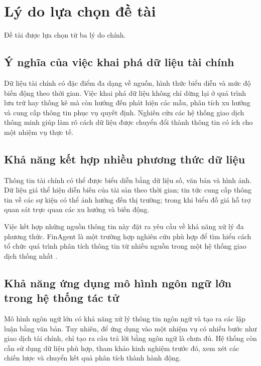\section{Lý do lựa chọn đề tài}

Đề tài được lựa chọn từ ba lý do chính.

\subsection{Ý nghĩa của việc khai phá dữ liệu tài chính}

Dữ liệu tài chính có đặc điểm đa dạng về nguồn, hình thức biểu diễn và mức độ biến động theo thời gian. Việc khai phá dữ liệu không chỉ dừng lại ở quá trình lưu trữ hay thống kê mà còn hướng đến phát hiện các mẫu, phân tích xu hướng và cung cấp thông tin phục vụ quyết định. Nghiên cứu các hệ thống giao dịch thông minh giúp làm rõ cách dữ liệu được chuyển đổi thành thông tin có ích cho một nhiệm vụ thực tế.

\subsection{Khả năng kết hợp nhiều phương thức dữ liệu}

Thông tin tài chính có thể được biểu diễn bằng dữ liệu số, văn bản và hình ảnh. Dữ liệu giá thể hiện diễn biến của tài sản theo thời gian; tin tức cung cấp thông tin về các sự kiện có thể ảnh hưởng đến thị trường; trong khi biểu đồ giá hỗ trợ quan sát trực quan các xu hướng và biến động.

Việc kết hợp những nguồn thông tin này đặt ra yêu cầu về khả năng xử lý đa phương thức. FinAgent là một trường hợp nghiên cứu phù hợp để tìm hiểu cách tổ chức quá trình phân tích thông tin từ nhiều nguồn trong một hệ thống giao dịch thống nhất \cite{zhang2024finagent}.

\subsection{Khả năng ứng dụng mô hình ngôn ngữ lớn trong hệ thống tác tử}

Mô hình ngôn ngữ lớn có khả năng xử lý thông tin ngôn ngữ và tạo ra các lập luận bằng văn bản. Tuy nhiên, để ứng dụng vào một nhiệm vụ có nhiều bước như giao dịch tài chính, chỉ tạo ra câu trả lời bằng ngôn ngữ là chưa đủ. Hệ thống còn cần sử dụng dữ liệu phù hợp, tham khảo kinh nghiệm trước đó, xem xét các chiến lược và chuyển kết quả phân tích thành hành động.

